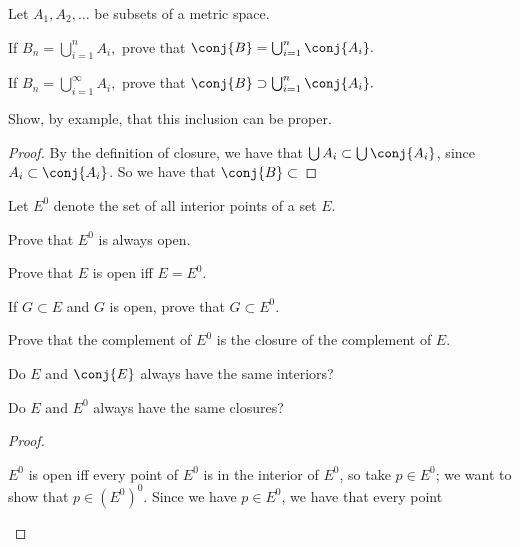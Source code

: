 \documentclass{assignment}
\begin{document}
\begin{question}[7]
  Let $A_1, A_2, \ldots$ be subsets of a metric space.
\begin{qparts}
\item If $B_n = \bigcup_{i=1}^n A_i,$ prove that $\conj{B} = \bigcup_{i=1}^n \conj{A_i}.$
\item If $B_n = \bigcup_{i=1}^\infty A_i,$ prove that $\conj{B} \supset \bigcup_{i=1}^n \conj{A_i}.$
\end{qparts}
Show, by example, that this inclusion can be proper.
\end{question}
\begin{proof}
  By the definition of closure, we have that $\bigcup A_i \subset \bigcup \conj{A_i}$, since $A_i 
  \subset \conj{A_i}$. So we have that $\conj{B} \subset $
\end{proof}

\begin{question}[9]
Let $E^0$ denote the set of all interior points of a set $E$. 
\begin{qparts}
\item Prove that $E^0$ is always open.
\item Prove that $E$ is open iff $E = E^0$.
\item If $G\subset E$ and $G$ is open, prove that $G\subset E^0$.
\item Prove that the complement of $E^0$ is the closure of the complement of $E$.
\item Do $E$ and $\conj{E}$ always have the same interiors?
\item Do $E$ and $E^0$ always have the same closures?
\end{qparts}
\end{question}
\begin{proof}
\begin{qparts}
\item $E^0$ is open iff every point of $E^0$ is in the interior of $E^0$, so take $p\in E^0$; we want 
to show that $p\in(E^0)^0$. Since we have $p\in E^0$, we have that every point 
\end{qparts}
\end{proof}
\end{document}
